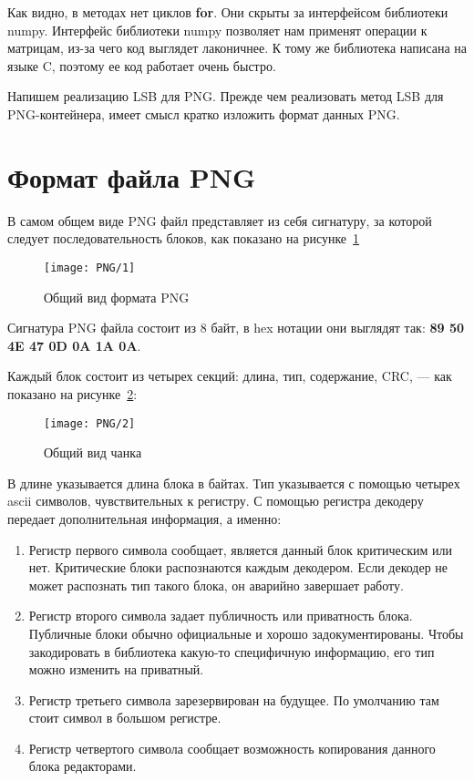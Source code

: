 Как видно, в методах нет циклов \textbf{for}. Они скрыты за интерфейсом библиотеки numpy.
Интерфейс библиотеки numpy позволяет нам применят операции к матрицам,
из-за чего код выглядет лаконичнее. К тому же библиотека написана на языке C,
поэтому ее код работает очень быстро.

Напишем реализацию LSB для PNG. Прежде чем реализовать метод LSB для PNG-контейнера,
имеет смысл кратко изложить формат данных PNG.

\section{Формат файла PNG}

В самом общем виде PNG файл представляет из себя сигнатуру,
за которой следует последовательность блоков,
как показано на рисунке~\ref{img:png_1}
\begin{figure}[ht!]
    \caption{Общий вид формата PNG}
    \texttt{[image: PNG/1]}
    \centering
    \label{img:png_1}
\end{figure}

Сигнатура PNG файла состоит из 8 байт, в hex нотации они выглядят так:
\textbf{89 50 4E 47 0D 0A 1A 0A}.

Каждый блок состоит из четырех секций: длина, тип, содержание, CRC, --- как показано на рисунке~\ref{img:png_2}:
\begin{figure}[ht!]
    \caption{Общий вид чанка}
    \texttt{[image: PNG/2]}
    \centering
    \label{img:png_2}
\end{figure}
В длине указывается длина блока в байтах. Тип указывается с помощью четырех ascii символов,
чувствительных к регистру. С помощью регистра декодеру передает дополнительная информация, а именно:
\begin{enumerate}
    \item Регистр первого символа сообщает, является данный блок критическим или нет. Критические
    блоки распознаются каждым декодером. Если декодер не может распознать тип такого блока,
    он аварийно завершает работу.
    \item Регистр второго символа задает публичность или приватность блока.
    Публичные блоки обычно официальные и хорошо задокументированы. Чтобы закодировать в библиотека
    какую-то специфичную информацию, его тип можно изменить на приватный.
    \item Регистр третьего символа зарезервирован на будущее. По умолчанию там стоит символ в большом регистре.
    \item Регистр четвертого символа сообщает возможность копирования данного блока редакторами.
\end{enumerate}

